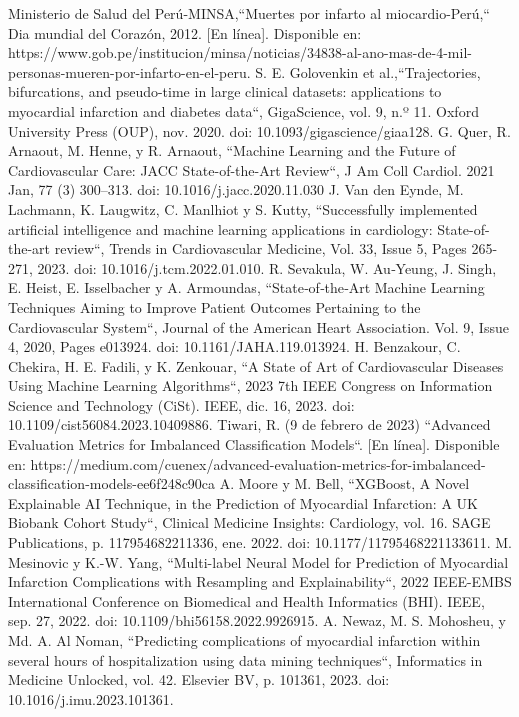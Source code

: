 \documentclass[conference]{IEEEtran}
\begin{document}
\begin{thebibliography}{00}
 Ministerio de Salud del Perú-MINSA,``Muertes por infarto al miocardio-Perú,`` Dia mundial del Corazón, 2012. [En línea]. Disponible en: https://www.gob.pe/institucion/minsa/noticias/34838-al-ano-mas-de-4-mil-personas-mueren-por-infarto-en-el-peru.
  S. E. Golovenkin et al.,``Trajectories, bifurcations, and pseudo-time in large clinical datasets: applications to myocardial infarction and diabetes data``, GigaScience, vol. 9, n.º 11. Oxford University Press (OUP), nov. 2020. doi: 10.1093/gigascience/giaa128.
 G. Quer, R. Arnaout, M. Henne, y R. Arnaout, ``Machine Learning and the Future of Cardiovascular Care: JACC State-of-the-Art Review``, J Am Coll Cardiol. 2021 Jan, 77 (3) 300–313. doi: 10.1016/j.jacc.2020.11.030
 J. Van den Eynde, M. Lachmann, K. Laugwitz, C. Manlhiot y S. Kutty, ``Successfully implemented artificial intelligence and machine learning applications in cardiology: State-of-the-art review``, Trends in Cardiovascular Medicine, Vol. 33, Issue 5, Pages 265-271, 2023. doi: 10.1016/j.tcm.2022.01.010.
 R. Sevakula, W. Au‐Yeung, J. Singh, E. Heist, E. Isselbacher y A. Armoundas, ``State‐of‐the‐Art Machine Learning Techniques Aiming to Improve Patient Outcomes Pertaining to the Cardiovascular System``, Journal of the American Heart Association. Vol. 9, Issue 4, 2020, Pages e013924. doi: 10.1161/JAHA.119.013924.
 H. Benzakour, C. Chekira, H. E. Fadili, y K. Zenkouar, ``A State of Art of Cardiovascular Diseases Using Machine Learning Algorithms``, 2023 7th IEEE Congress on Information Science and Technology (CiSt). IEEE, dic. 16, 2023. doi: 10.1109/cist56084.2023.10409886.
 Tiwari, R. (9 de febrero de 2023) ``Advanced Evaluation Metrics for Imbalanced Classification Models``. [En línea]. Disponible en: https://medium.com/cuenex/advanced-evaluation-metrics-for-imbalanced-classification-models-ee6f248c90ca
  A. Moore y M. Bell, ``XGBoost, A Novel Explainable AI Technique, in the Prediction of Myocardial Infarction: A UK Biobank Cohort Study``, Clinical Medicine Insights: Cardiology, vol. 16. SAGE Publications, p. 117954682211336, ene. 2022. doi: 10.1177/11795468221133611.
 M. Mesinovic y K.-W. Yang, ``Multi-label Neural Model for Prediction of Myocardial Infarction Complications with Resampling and Explainability``, 2022 IEEE-EMBS International Conference on Biomedical and Health Informatics (BHI). IEEE, sep. 27, 2022. doi: 10.1109/bhi56158.2022.9926915.
 A. Newaz, M. S. Mohosheu, y Md. A. Al Noman, ``Predicting complications of myocardial infarction within several hours of hospitalization using data mining techniques``, Informatics in Medicine Unlocked, vol. 42. Elsevier BV, p. 101361, 2023. doi: 10.1016/j.imu.2023.101361.

\end{thebibliography}
\end{document}
